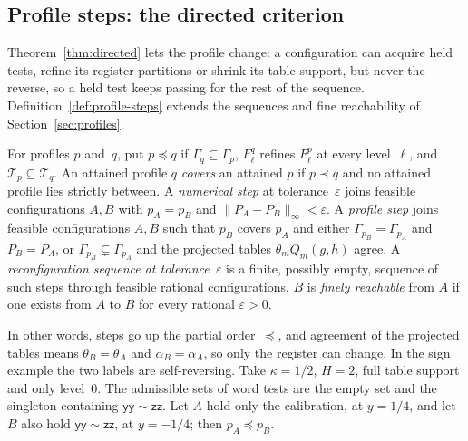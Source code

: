 \subsection{Profile steps: the directed criterion}\label{sec:directed}

Theorem~\ref{thm:directed} lets the profile change: a configuration can
acquire held tests, refine its register partitions or shrink its table
support, but never the reverse, so a held test keeps passing for the rest
of the sequence. Definition~\ref{def:profile-steps} extends the sequences and fine
reachability of Section~\ref{sec:profiles}.

\begin{definition}\label{def:profile-steps}
For profiles $p$ and~$q$, put $p\preceq q$ if $\Gamma_q\subseteq\Gamma_p$,
$F^q_\ell$ refines $F^p_\ell$ at every level~$\ell$, and
$\mathcal T_p\subseteq\mathcal T_q$. An attained profile $q$ \emph{covers}
an attained $p$ if $p\prec q$ and no attained profile lies strictly between.
A \emph{numerical step} at tolerance~$\varepsilon$ joins feasible
configurations $A,B$ with $p_A=p_B$ and $\|P_A-P_B\|_\infty<\varepsilon$.
A \emph{profile step} joins feasible configurations $A,B$ such that $p_B$
covers $p_A$ and either $\Gamma_{p_B}=\Gamma_{p_A}$ and $P_B=P_A$, or
$\Gamma_{p_B}\subsetneq\Gamma_{p_A}$ and the projected tables
$\theta_mQ_m(g,h)$ agree. A \emph{reconfiguration sequence at
tolerance~$\varepsilon$} is a finite, possibly empty, sequence of such
steps through feasible rational configurations. $B$ is \emph{finely
reachable} from $A$ if one exists from $A$ to $B$ for every rational
$\varepsilon>0$.
\end{definition}

In other words, steps go up the partial order~$\preceq$, and agreement of
the projected tables means $\theta_B=\theta_A$ and $\alpha_B=\alpha_A$, so
only the register can change. %
In the sign example the two labels are self-reversing. Take $\kappa=1/2$,
$H=2$, full table support and only level~$0$. The admissible sets of word tests are the empty set and the
singleton containing $\mathsf{yy}\sim\mathsf{zz}$. Let $A$ hold only
the calibration, at $y=1/4$, and let $B$ also hold
$\mathsf{yy}\sim\mathsf{zz}$, at $y=-1/4$; then $p_A\preceq p_B$.

